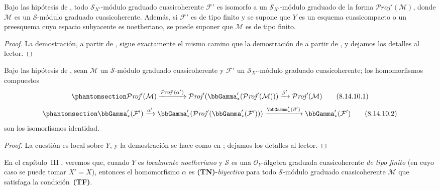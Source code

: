 \documentclass[oneside,10pt]{amsart}
\newcommand{\oldpage}[2][]{\marginnote{\normalfont\footnotesize\textbf{#1}~|~#2}\ignorespaces}
\let\EGAOriginalLabel\label
\renewcommand{\label}[1]{\phantomsection\EGAOriginalLabel{#1}}
\begin{document}
\begin{corollary}[8.14.9]
\label{II.8.14.9-fr}
Bajo las hipótesis de \textup{}, todo $\mathcal{S}_{X'}$-módulo graduado cuasicoherente $\mathcal{F}'$ es isomorfo a un $\mathcal{S}_{X'}$-módulo graduado de la forma $\mathcal{P}\mathit{roj}'(\mathcal{M})$, donde $\mathcal{M}$ es un $\mathcal{S}$-módulo graduado cuasicoherente.
Además, si $\mathcal{F}'$ es de tipo finito y se supone que $Y$ es un esquema cuasicompacto o un preesquema cuyo espacio subyacente es noetheriano, se puede suponer que $\mathcal{M}$ es de tipo finito.
\end{corollary}

\begin{proof}
La demostración, a partir de , sigue exactamente el mismo camino que la demostración de  a partir de , y dejamos los detalles al lector.
\end{proof}

\begin{proposition}[8.14.10]
\label{II.8.14.10-fr}
Bajo las hipótesis de \textup{}, sean $\mathcal{M}$ un $\mathcal{S}$-módulo graduado cuasicoherente y $\mathcal{F}'$ un $\mathcal{S}_{X'}$-módulo graduado cuasicoherente;
los homomorfismos compuestos
\begin{equation}
\label{II.8.14.10.1-fr}
  \mathcal{P}\mathit{roj}'(\mathcal{M})
  \xrightarrow{\mathcal{P}\mathit{roj}'(\alpha')}
  \mathcal{P}\mathit{roj}'(\bbGamma'_*(\mathcal{P}\mathit{roj}'(\mathcal{M})))
  \xrightarrow{\beta'}\mathcal{P}\mathit{roj}'(\mathcal{M})
\tag{8.14.10.1}
\end{equation}
\begin{equation}
\label{II.8.14.10.2-fr}
  \bbGamma'_*(\mathcal{F}')
  \xrightarrow{\alpha'}
  \bbGamma'_*(\mathcal{P}\mathit{roj}'(\bbGamma'_*(\mathcal{F}')))
  \xrightarrow{\bbGamma'_*(\beta')}\bbGamma'_*(\mathcal{F}')
\tag{8.14.10.2}
\end{equation}
son los isomorfismos identidad.
\end{proposition}

\begin{proof}
La cuestión es local sobre $Y$, y la demostración se hace como en ;
dejamos los detalles al lector.
\end{proof}

\begin{remark}[8.14.11]
\label{II.8.14.11-fr}
En el capítulo~III , veremos que, cuando $Y$ es \emph{localmente noetheriano} y $\mathcal{S}$ es una $\mathcal{O}_Y$-álgebra graduada cuasicoherente \emph{de tipo finito} (en cuyo caso
\oldpage[II]{201}
se puede tomar $X'=X$), entonces el homomorfismo $\alpha$  es \textbf{(TN)}-\emph{biyectivo} para todo $\mathcal{S}$-módulo graduado cuasicoherente $\mathcal{M}$ que satisfaga la condición~\textbf{(TF)}.
\end{remark}
\end{document}
